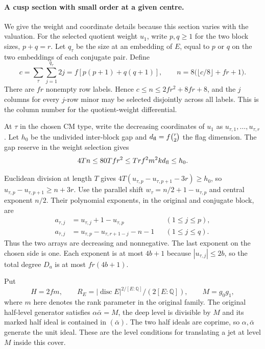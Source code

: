 \paragraph{A cusp section with small order at a given centre.}
We give the weight and coordinate details because this
section varies with the valuation. For the selected quotient weight \(u_1\), write \(p,q\ge1\) for the two block sizes, \(p+q=r\). Let \(q_\tau\) be the size at an embedding of \(E\), equal to \(p\) or \(q\) on the two embeddings of each conjugate pair. Define
\begin{equation}\label{eq:deep-quotient-column-count}
 c=\sum_{\tau}\sum_{j=1}^{q_\tau}2j
   =f[p(p+1)+q(q+1)],\qquad
 n=8\big(\lfloor c/8\rfloor+fr+1\big).
\end{equation}
There are \(fr\) nonempty row labels. Hence \(c\le n\le2fr^2+8fr+8\), and the \(j\) columns for every \(j\)-row minor may be selected disjointly across all labels. This is the column number for the quotient-weight differential.

At \(\tau\) in the chosen CM type, write the decreasing coordinates of \(u_1\) as \(u_{\tau,1},\ldots,u_{\tau,r}\). Let \(h_0\) be the undivided inter-block gap and \(d_{\rm fl}=f\binom r2\) the flag dimension. The gap reserve in the weight selection gives
\[
 4Tn\le80Tfr^2\le T r f^2m^2 k d_{\rm fl}\le h_0 .
\]

Euclidean division at length \(T\) gives \(4T(u_{\tau,p}-u_{\tau,p+1}-3r)\ge h_0\), so \(u_{\tau,p}-u_{\tau,p+1}\ge n+3r\). Use the parallel shift \(w_\tau=n/2+1-u_{\tau,p}\) and central exponent \(n/2\). Their polynomial exponents, in the original and conjugate block, are
\begin{align}
 a_{\tau,j}&=u_{\tau,j}+1-u_{\tau,p} &&(1\le j\le p),\nonumber\\
 a_{\bar\tau,j}&=u_{\tau,p}-u_{\tau,r+1-j}-n-1
                                    &&(1\le j\le q).\label{eq:deep-quotient-exponents}
\end{align}
Thus the two arrays are decreasing and nonnegative. The last exponent on the chosen side is one. Each exponent is at most \(4b+1\) because \(|u_{\tau,j}|\le2b\), so the total degree \(D_a\) is at most \(fr(4b+1)\).

Put
\[
 H=2fm,\qquad R_E=|\operatorname{disc}E|^{2/[E:\mathbb Q]}
                    /(2[E:\mathbb Q]),\qquad M=g_0g_1,
\]
where \(m\) here denotes the rank parameter in the original family. The
original half-level generator satisfies
\(\alpha\bar\alpha=M\), the deep level is divisible by
\(M\) and its marked half ideal is contained in
\((\bar\alpha)\). The two half ideals are coprime, so
\(\alpha,\bar\alpha\) generate the unit ideal. These are
the level conditions for translating a jet at level \(M\)
inside this cover.

